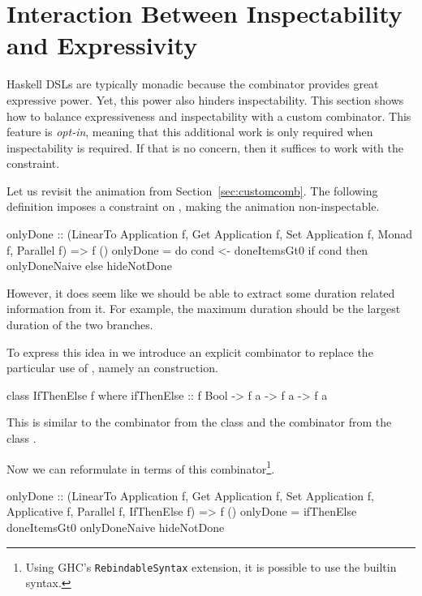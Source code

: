 \section{Interaction Between Inspectability and Expressivity}
\label{sec:interaction}

Haskell DSLs are typically monadic because the \hs{>>=} combinator provides
great expressive power. Yet, this power also hinders inspectability. This section shows how to balance 
expressiveness and inspectability with a custom combinator. This feature is \emph{opt-in}, meaning that this additional work is only required when inspectability is required. If that is no concern, then it suffices to work with the  constraint.

Let us revisit the  animation from Section~\ref{sec:customcomb}. The following definition imposes a  constraint on , making the animation non-inspectable.

\begin{spec}
onlyDone :: (LinearTo Application f, Get Application f,
  Set Application f, Monad f, Parallel f) => f ()
onlyDone = do
  cond <- doneItemsGt0
  if cond then onlyDoneNaive else hideNotDone
\end{spec}

However, it does seem like we should be able to extract some duration related
information from it. For example, the maximum duration should be the largest
duration of the two branches.

To express this idea in \dsl{} we introduce an explicit combinator to replace
the particular use of \hs{>>=}, namely an  construction. 

\begin{code}
class IfThenElse f where
  ifThenElse :: f Bool -> f a -> f a -> f a
\end{code}

This is similar to the  combinator from the  class
\cite{DBLP:phd/ethos/Yallop10} and the  combinator from the
 class \cite{Mokhov:2019:SAF:3352468.3341694}.

Now we can reformulate  in terms of this  combinator\footnote{Using GHC's \texttt{RebindableSyntax} extension, it is possible to use the builtin  syntax.}.

\begin{code}
onlyDone :: (LinearTo Application f, Get Application f,
  Set Application f, Applicative f, Parallel f, IfThenElse f)
  => f ()
onlyDone = ifThenElse doneItemsGt0 onlyDoneNaive hideNotDone
\end{code}

